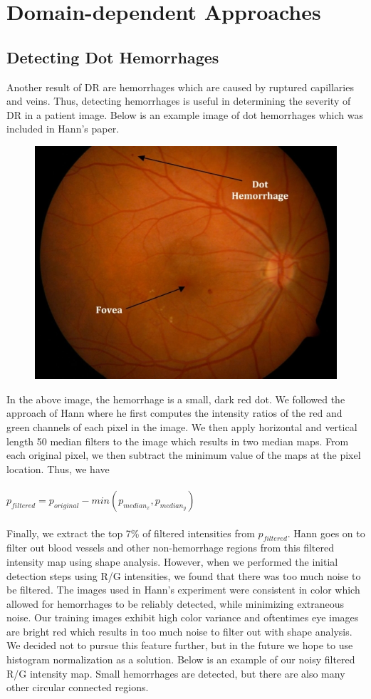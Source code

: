 \documentclass{article} %
\begin{document}
\section{Domain-dependent Approaches}
\subsection{Detecting Dot Hemorrhages}
Another result of DR are hemorrhages which are caused by ruptured capillaries and veins. Thus, detecting hemorrhages is useful in determining the severity of DR in a patient image. Below is an example image of dot hemorrhages which was included in Hann's paper.
\begin{figure}[H]
	\centerline{\includegraphics[scale=0.3]{./images/dh.jpg}}
\end{figure}
In the above image, the hemorrhage is a small, dark red dot. We followed the approach of Hann where he first computes the intensity ratios of the red and green channels of each pixel in the image. We then apply horizontal and vertical length 50 median filters to the image which results in two median maps. From each original pixel, we then subtract the minimum value of the maps at the pixel location. Thus, we have \\ \\
$p_{filtered} = p_{original} - min(p_{median_x},p_{median_y})$ \\ \\
Finally, we extract the top 7\% of filtered intensities from $p_{filtered}$. Hann goes on to filter out blood vessels and other non-hemorrhage regions from this filtered intensity map using shape analysis. However, when we performed the initial detection steps using R/G intensities, we found that there was too much noise to be filtered. The images used in Hann's experiment were consistent in color which allowed for hemorrhages to be reliably detected, while minimizing extraneous noise. Our training images exhibit high color variance and oftentimes eye images are bright red which results in too much noise to filter out with shape analysis. We decided not to pursue this feature further, but in the future we hope to use histogram normalization as a solution. Below is an example of our noisy filtered R/G intensity map. Small hemorrhages are detected, but there are also many other circular connected regions.
\end{document}
